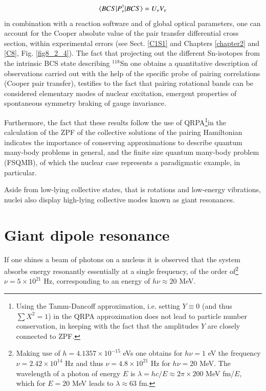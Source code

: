 \begin{align}\label{eq0.1.104}
\langle {BCS|P^\dagger_\nu|BCS} \rangle=U_\nu V_\nu
\end{align}
in combination with a reaction software and of global optical parameters, one can account for the Cooper absolute value of the pair transfer differential cross section, within experimental errors (see Sect.  \ref{C1S1} and Chapters \ref{chapter2} and \ref{C8}, Fig. \ref{fig8_2_4}). The fact that projecting out the different Sn-isotopes from the intrinsic BCS state describing $^{118}$Sn one obtains a quantitative description of observations carried out with the help of the specific probe of pairing correlations (Cooper pair transfer), testifies to the fact that pairing rotational bands can be considered elementary modes of nuclear excitation, emergent properties of spontaneous symmetry braking of  gauge invariance. 

Furthermore, the fact that these results follow the use of QRPA\footnote{Using the Tamm-Dancoff approximation, i.e. setting $Y\equiv0$ (and thus $\sum X^2=1$) in the QRPA approximation does not lead to particle number conservation, in keeping with the fact that the amplitudes $Y$ are closely connected to ZPF.}in the calculation of the ZPF of the collective solutions of the pairing Hamiltonian indicates the importance of conserving approximations to describe quantum many-body problems in general, and the finite size quantum many-body problem (FSQMB), of which the nuclear case represents a paradigmatic example, in particular. 

Aside from low-lying collective states, that is rotations and low-energy vibrations, nuclei also display high-lying collective modes known as giant resonances.
\section{Giant dipole resonance}\label{S1.5}
If one shines a beam of photons on a nucleus it is observed that the system 
absorbs energy resonantly essentially at a single frequency, of the order of\footnote{Making use of $h=4.1357\times10^{-15}$ eVs one obtains for $h\nu=1$ eV the frequency $\nu=2.42\times10^{14}$ Hz and thus $\nu=4.8\times10^{21}$ Hz for $h\nu=20$ MeV. The wavelength of a photon of energy $E$ is $\lambda=hc/E\approx2\pi\times200$ MeV fm/$E$, which for $E=20$ MeV leads to $\lambda\approx63$ fm.} $\nu=5\times10^{21}$ Hz, corresponding to an energy of $h\nu\approx20$ MeV.

